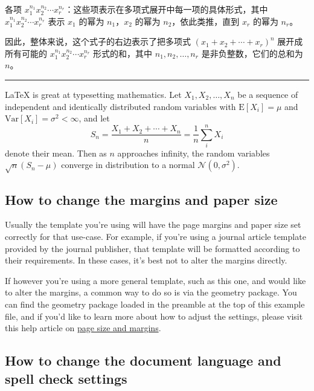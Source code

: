 \documentclass{article}
\begin{document}
   各项 \(x_1^{n_1} x_2^{n_2} \cdots x_r^{n_r}\)：这些项表示在多项式展开中每一项的具体形式，其中 \(x_1^{n_1} x_2^{n_2} \cdots x_r^{n_r}\) 表示 \(x_1\) 的幂为 \(n_1\)，\(x_2\) 的幂为 \(n_2\)，依此类推，直到 \(x_r\) 的幂为 \(n_r\)。

因此，整体来说，这个式子的右边表示了把多项式 \((x_1 + x_2 + \cdots + x_r)^n\) 展开成所有可能的 \(x_1^{n_1} x_2^{n_2} \cdots x_r^{n_r}\) 形式的和，其中 \(n_1, n_2, \ldots, n_r\) 是非负整数，它们的总和为 \(n\)。

\vspace{10pt} %
\hrule

\vspace{1cm}

\LaTeX{} is great at typesetting mathematics. Let $X_1, X_2, \ldots, X_n$ be a sequence of independent and identically distributed random variables with $\text{E}[X_i] = \mu$ and $\text{Var}[X_i] = \sigma^2 < \infty$, and let
\[S_n = \frac{X_1 + X_2 + \cdots + X_n}{n}
      = \frac{1}{n}\sum_{i}^{n} X_i\]
denote their mean. Then as $n$ approaches infinity, the random variables $\sqrt{n}(S_n - \mu)$ converge in distribution to a normal $\mathcal{N}(0, \sigma^2)$.


\subsection{How to change the margins and paper size}

Usually the template you're using will have 
the page margins and paper size set correctly for that use-case. For example, if you're using a journal article template provided by the journal publisher, that template will be formatted according to their requirements. In these cases, it's best not to alter the margins directly.

If however you're using a more general template, such as this one, and would like to alter the margins, a common way to do so is via the geometry package. You can find the geometry package loaded in the preamble at the top of this example file, and if you'd like to learn more about how to adjust the settings, please visit this help article on \href{https://www.overleaf.com/learn/latex/page_size_and_margins}{page size and margins}.

\subsection{How to change the document language and spell check settings}
\end{document}
